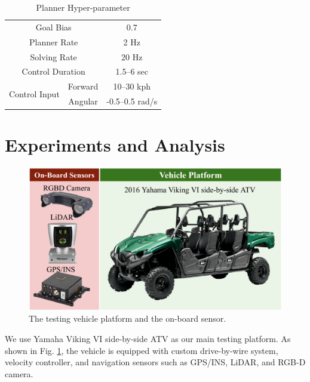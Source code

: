 \documentclass[../thesis.tex]{subfiles}
\begin{document}
\begin{table}[t]
    	\centering
    	\caption{Planner Hyper-parameter}
    	\label{table:rrt-parameters}
    	\begin{small}
    	\begin{sc}
    	\begin{tabular}{ccc}
           	\midrule \midrule
           	\multicolumn{2}{c}{Goal Bias} & 0.7 \\
           	\multicolumn{2}{c}{Planner Rate} & 2 Hz \\
           	\multicolumn{2}{c}{Solving Rate} & 20 Hz \\
           	\multicolumn{2}{c}{Control Duration} & 1.5--6 sec \\
           	\multirow{2}{*}{Control Input} & Forward & 10--30 kph \\
           	                                                       	& Angular & -0.5--0.5 rad/s \\
           	\toprule
    	\end{tabular}
    	\end{sc}
    	\end{small}
\end{table}
 
 
\section{Experiments and Analysis} \label{sec:rrt-experiments}
 
 
\begin{figure}[t]
    	\begin{center}
    	 \centerline{\includegraphics[width=0.7\columnwidth]{./RRTPlanner/fig/viking.png}}
           	\caption{The testing vehicle platform and the on-board sensor.}
           	\label{fig:viking}
    	\end{center}
\end{figure}
 
We use Yamaha Viking VI side-by-side ATV as our main testing platform. As shown in Fig. \ref{fig:viking}, the vehicle is equipped with custom drive-by-wire system, velocity controller, and navigation sensors such as GPS/INS, LiDAR, and RGB-D camera.
 
\end{document}
